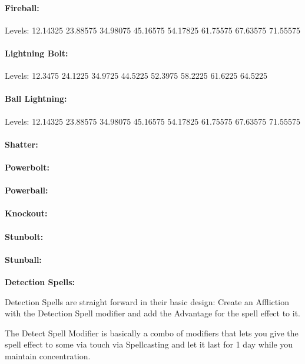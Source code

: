 \begin{multicols*}{2}
	\paragraph{Fireball:} Levels: 12.14325 23.88575 34.98075 45.16575 54.17825 61.75575 67.63575 71.55575
	
	\paragraph{Lightning Bolt:} Levels: 12.3475 24.1225 34.9725 44.5225 52.3975 58.2225 61.6225 64.5225
	
	\paragraph{Ball Lightning:} Levels: 12.14325 23.88575 34.98075 45.16575 54.17825 61.75575 67.63575 71.55575
	
	\paragraph{Shatter:}
	\paragraph{Powerbolt:}
	\paragraph{Powerball:}
	\paragraph{Knockout:}
	\paragraph{Stunbolt:}
	\paragraph{Stunball:}
	
	\textbf{Detection Spells:\\}
	
	Detection Spells are straight forward in their basic design: Create an Affliction with the Detection Spell modifier and add the Advantage for the spell effect to it.
	
	The Detect Spell Modifier is basically a combo of modifiers that lets you give the spell effect to some via touch via Spellcasting and let it last for 1 day while you maintain concentration.
	

\end{multicols*}
